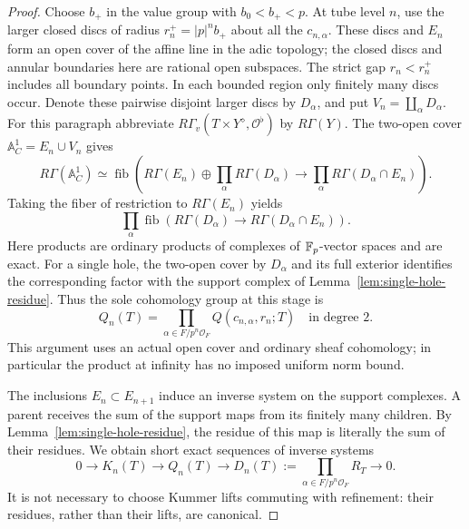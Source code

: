 \begin{proof}
Choose \(b_+\) in the value group with \(b_0<b_+<p\).  At tube
level \(n\), use the larger closed discs of radius
\(r_n^+=|p|^n b_+\) about all the \(c_{n,\alpha}\).
These discs and \(E_n\) form an open cover of the affine line in
the adic topology; the closed discs and annular boundaries here
are rational open subspaces.  The strict gap \(r_n<r_n^+\)
includes all boundary points.  In each bounded region only
finitely many discs occur.
Denote these pairwise disjoint larger discs by \(D_\alpha\), and
put \(V_n=\coprod_\alpha D_\alpha\).
For this paragraph abbreviate
\(R\Gamma_v(T\times Y^\diamond,\mathcal O^\flat)\) by
\(R\Gamma(Y)\).  The two-open cover
\(\mathbb A^1_C=E_n\cup V_n\) gives
\[
 R\Gamma(\mathbb A^1_C)\simeq
 \operatorname{fib}\left(
 R\Gamma(E_n)\oplus\prod_\alpha R\Gamma(D_\alpha)
 \longrightarrow
 \prod_\alpha R\Gamma(D_\alpha\cap E_n)\right).
\]
Taking the fiber of restriction to \(R\Gamma(E_n)\) yields
\[
 \prod_\alpha\operatorname{fib}\left(
 R\Gamma(D_\alpha)\longrightarrow
 R\Gamma(D_\alpha\cap E_n)\right).
\]
Here products are ordinary products of complexes of
\(\mathbb F_p\)-vector spaces and are exact.  For a single hole, the
two-open cover by \(D_\alpha\) and its full exterior identifies
the corresponding factor with the support complex of
Lemma~\ref{lem:single-hole-residue}.  Thus the sole cohomology group
at this stage is
\begin{equation}
 Q_n(T)=
 \prod_{\alpha\in F/p^n\mathcal O_F}
       Q(c_{n,\alpha},r_n;T)
 \quad\text{in degree }2.
 \label{eq:analytic-level-support}
\end{equation}
This argument uses an actual open cover and ordinary sheaf
cohomology; in particular the product at infinity has no imposed
uniform norm bound.

The inclusions \(E_n\subset E_{n+1}\) induce an inverse system on
the support complexes.  A parent receives the sum of the support
maps from its finitely many children.  By
Lemma~\ref{lem:single-hole-residue}, the residue of this map is
literally the sum of their residues.  We obtain short exact
sequences of inverse systems
\begin{equation}
 0\longrightarrow K_n(T)\longrightarrow Q_n(T)
 \longrightarrow
 D_n(T):=\prod_{\alpha\in F/p^n\mathcal O_F}R_T
 \longrightarrow0.
 \label{eq:analytic-residue-system}
\end{equation}
It is not necessary to choose Kummer lifts commuting with
refinement: their residues, rather than their lifts, are
canonical.


\end{proof}
